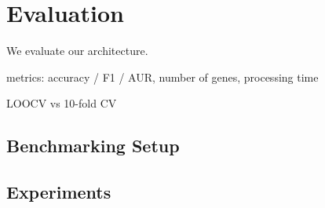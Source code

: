 \chapter{Evaluation}
\label{chapter:evaluation}

We evaluate our architecture.

metrics: accuracy / F1 / AUR, number of genes, processing time

LOOCV vs 10-fold CV

\section{Benchmarking Setup}
\label{sec:benchmarkSetup}


\section{Experiments}
\label{sec:experiments}